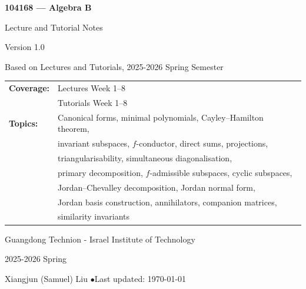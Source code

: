 \begin{titlepage}
\centering
\vspace*{3cm}
{\Huge\bfseries\color{defblue} 104168 --- Algebra B\par}
\vspace{0.8cm}
{\LARGE Lecture and Tutorial Notes \par}
\vspace{0.5cm}
{\large\color{defblue!70} Version 1.0\par}
\vspace{1.5cm}
{\large Based on Lectures and Tutorials, 2025-2026 Spring Semester\par}
\vspace{0.6cm}
\begin{tabular}{ll}
  \textbf{Coverage:} & Lectures Week 1--8 \\
                     & Tutorials Week 1--8 \\
  \textbf{Topics:}   & Canonical forms, minimal polynomials, Cayley--Hamilton theorem, \\
                     & invariant subspaces, $f$-conductor, direct sums, projections, \\
                     & triangularisability, simultaneous diagonalisation, \\
                     & primary decomposition, $f$-admissible subspaces, cyclic subspaces, \\
                     & Jordan--Chevalley decomposition, Jordan normal form, \\
                     & Jordan basis construction, annihilators, companion matrices, \\
                     & similarity invariants
\end{tabular}\par
\vspace{1.5cm}
{\large Guangdong Technion - Israel Institute of Technology\par}
\vspace{0.5cm}
{\large 2025-2026 Spring\par}
\vfill
{\small Xiangjun (Samuel) Liu \quad$\bullet$\quad Last updated: \today\par}
\end{titlepage}